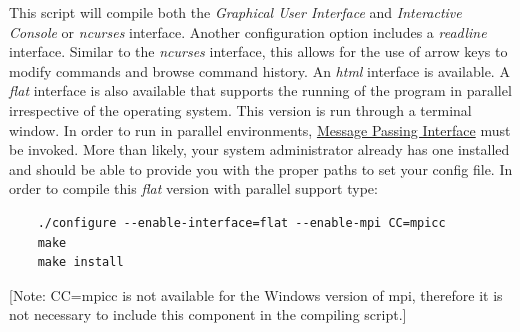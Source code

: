 This script will compile both the \emph{Graphical User Interface} and \emph{Interactive Console} or \emph{ncurses} 
interface.  Another configuration option includes a \emph{readline} interface.  Similar to the \emph{ncurses} interface, 
this allows for the use of arrow keys to modify commands and browse command history.  An \emph{html} interface is  
available. A \emph{flat} interface is also available that supports the running of the program in parallel irrespective of 
the operating system. This version is run through a terminal window. In order to run \poy in parallel environments, 
\href{http://www-unix.mcs.anl.gov/mpi/}{Message Passing Interface} must be invoked. More than likely, your system 
administrator already has one installed and should be able to provide you with the proper paths to set your config file. 
In order to compile this \emph{flat} version with parallel support type: 
	\begin{verbatim}
	./configure --enable-interface=flat --enable-mpi CC=mpicc
	make
	make install
	\end{verbatim}
[Note: CC=mpicc is not available for the Windows version of mpi, therefore it is not necessary to include this component in the compiling script.] 



